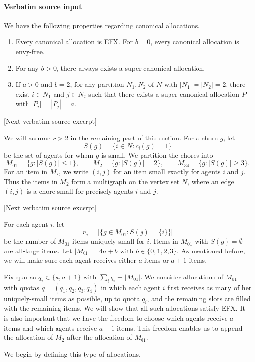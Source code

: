 \documentclass[10pt]{article}
\begin{document}
\paragraph{Verbatim source input}
\begin{ReviewVerbatim}
\begin{lemma}\label{lem:canonical}
    We have the following properties regarding canonical allocations.
    \begin{enumerate}[label=(\alph*)]
        \item Every canonical allocation is EFX. For $b=0$, every canonical allocation is envy-free.
        \item For any $b>0$, there always exists a super-canonical allocation.
        \item If $a>0$ and $b=2$, for any partition $N_1,N_2$ of $N$ with $|N_1|=|N_2|=2$, there exist $i\in N_1$ and $j\in N_2$ such that there exists a super-canonical allocation $P$ with $|P_i|=|P_j|=a$.
    \end{enumerate}
\end{lemma}

[Next verbatim source excerpt]

We will assume $r>2$ in the remaining part of this section.
For a chore $g$, let
\[
 S(g)=\{i\in N:c_i(g)=1\}
\]
be the set of agents for whom $g$ is small.  We partition the chores into
\[
M_{01}=\{g:|S(g)|\le 1\},\qquad
M_2=\{g:|S(g)|=2\},\qquad
M_{34}=\{g:|S(g)|\ge 3\}.
\]
For an item in $M_2$, we write $(i,j)$ for an item small exactly for agents
$i$ and $j$.  Thus the items in $M_2$ form a multigraph on the vertex set
$N$, where an edge $(i,j)$ is a chore small for precisely agents $i$ and $j$.

[Next verbatim source excerpt]

For each agent $i$, let
\[
 n_i=\left|\{g\in M_{01}:S(g)=\{i\}\}\right|
\]
be the number of $M_{01}$ items uniquely small for $i$.  Items in $M_{01}$
with $S(g)=\emptyset$ are all-large items.
Let $|M_{01}|=4a+b$ with $b\in\{0,1,2,3\}$.
As mentioned before, we will make sure each agent receives either $a$ items or $a+1$ items.

Fix quotas $q_i\in\{a,a+1\}$ with $\sum_i q_i=|M_{01}|$.
We consider allocations of $M_{01}$ with quotas $q=(q_1,q_2,q_3,q_4)$ in which each agent $i$ first receives as many of her uniquely-small items as possible, up to quota $q_i$, and the remaining slots are filled with the remaining items.
We will show that all such allocations satisfy EFX.
It is also important that we have the freedom to choose which agents receive $a$ items and which agents receive $a+1$ items.
This freedom enables us to append the allocation of $M_2$ after the allocation of $M_{01}$.

We begin by defining this type of allocations.
\end{ReviewVerbatim}
\end{document}
